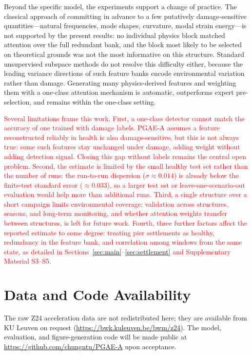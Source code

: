 \documentclass[11pt,a4paper]{article}
\begin{document}
Beyond the specific model, the experiments support a change of practice. The
classical approach of committing in advance to a few putatively
damage-sensitive quantities---natural frequencies, mode shapes, curvature,
modal strain energy---is not supported by the present results: no individual
physics block matched attention over the full redundant bank, and the block
most likely to be selected on theoretical grounds was not the most informative
on this structure. Standard unsupervised subspace methods do not resolve this
difficulty either, because the leading variance directions of such feature banks
encode environmental variation rather than damage. Generating many
physics-derived features and weighting them with a one-class attention
mechanism is automatic, outperforms expert pre-selection, and remains within the
one-class setting.

\textcolor{red}{Several limitations frame this work. First, a one-class
detector cannot match the accuracy of one trained with damage labels.
PGAE-A assumes a feature reconstructed reliably in health is also
damage-sensitive, but this is not always true: some such features stay
unchanged under damage, adding weight without adding detection signal.
Closing this gap without labels remains the central open problem. Second,
the estimate is
limited by the small healthy test set rather than the number of runs: the
run-to-run dispersion ($\sigma\approx0.014$) is already below the
finite-test standard error ($\approx0.033$), so a larger test set or
leave-one-scenario-out evaluation would help more than additional runs.
Third, a single structure over a short campaign limits environmental
coverage; validation across structures, seasons, and long-term
monitoring, and whether attention weights transfer between structures, is
left for future work. Fourth, three further factors affect the reported
estimate to some degree: treating pier settlements as healthy, redundancy
in the feature bank, and correlation among windows from the same state, as
detailed in Sections~\ref{sec:main}--\ref{sec:settlement} and Supplementary
Material S3--S5.}

\color{red}
\section*{Data and Code Availability}
The raw Z24
acceleration data are not redistributed here; they are available from KU
Leuven on request (\url{https://bwk.kuleuven.be/bwm/z24}). The model,
evaluation, and figure-generation code will be made public at
\url{https://github.com/chungntu/PGAE-A} upon acceptance.
\end{document}
